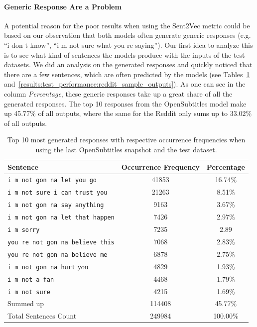 \paragraph{Generic Response Are a Problem} A potential reason for the poor results when using the Sent2Vec metric could be based on our observation that both models often generate generic responses (e.g. ``i don t know'', ``i m not sure what you re saying''). Our first idea to analyze this is to see what kind of sentences the models produce with the inputs of the test datasets. We did an analysis on the generated responses and quickly noticed that there are a few sentences, which are often predicted by the models (see Tables~\ref{results:test_performance:opensubtitles_sample_outputs} and~\ref{results:test_performance:reddit_sample_outputs}). As one can see in the column \emph{Percentage}, these generic responses take up a great share of all the generated responses. The top 10 responses from the OpenSubtitles model make up 45.77\% of all outputs, where the same for the Reddit only sums up to 33.02\% of all outputs.
\\
\begin{table}[H]
	\centering
	\begin{adjustbox}{max width=\textwidth}
		\begin{tabularx}{\textwidth}{lcc}
			\toprule
			Sentence & Occurrence Frequency & Percentage \\ \midrule
			\texttt{i m not gon na let you go} & 41853 & 16.74\%\\
			\texttt{i m not sure i can trust you} & 21263 & 8.51\%\\
			\texttt{i m not gon na say anything} & 9163 & 3.67\%\\
			\texttt{i m not gon na let that happen} & 7426 & 2.97\%\\
			\texttt{i m sorry} & 7235 & 2.89\\
			\texttt{you re not gon na believe this} & 7068 & 2.83\%\\
			\texttt{you re not gon na believe me} & 6878 & 2.75\%\\
			\texttt{i m not gon na hurt} you & 4829 & 1.93\%\\
			\texttt{i m not a fan} & 4468 & 1.79\%\\
			\texttt{i m not sure} & 4215 & 1.69\%\\
			\midrule
			Summed up & 114408 & 45.77\%\\
			\midrule
			\midrule
			Total Sentences Count & 249984 & 100.00\%\\
			\bottomrule
		\end{tabularx}
	\end{adjustbox}
	\caption{Top 10 most generated responses with respective occurrence frequencies when using the last OpenSubtitles snapshot and the test dataset.}
	\label{results:test_performance:opensubtitles_sample_outputs}
\end{table}

